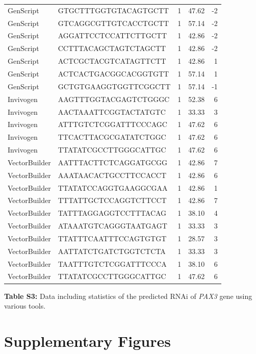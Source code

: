\documentclass[
]{article}
\begin{document}
\begin{longtable}[]{@{}llrrr@{}}
GenScript & GTGCTTTGGTGTACAGTGCTT & 1 & 47.62 & -2 \\
GenScript & GTCAGGCGTTGTCACCTGCTT & 1 & 57.14 & -2 \\
GenScript & AGGATTCCTCCATTCTTGCTT & 1 & 42.86 & -2 \\
GenScript & CCTTTACAGCTAGTCTAGCTT & 1 & 42.86 & -2 \\
GenScript & ACTCGCTACGTCATAGTTCTT & 1 & 42.86 & 1 \\
GenScript & ACTCACTGACGGCACGGTGTT & 1 & 57.14 & 1 \\
GenScript & GCTGTGAAGGTGGTTCGGCTT & 1 & 57.14 & -1 \\
Invivogen & AAGTTTGGTACGAGTCTGGGC & 1 & 52.38 & 6 \\
Invivogen & AACTAAATTCGGTACTATGTC & 1 & 33.33 & 3 \\
Invivogen & ATTTGTCTCGGATTTCCCAGC & 1 & 47.62 & 6 \\
Invivogen & TTCACTTACGCGATATCTGGC & 1 & 47.62 & 6 \\
Invivogen & TTATATCGCCTTGGGCATTGC & 1 & 47.62 & 6 \\
VectorBuilder & AATTTACTTCTCAGGATGCGG & 1 & 42.86 & 7 \\
VectorBuilder & AAATAACACTGCCTTCCACCT & 1 & 42.86 & 6 \\
VectorBuilder & TTATATCCAGGTGAAGGCGAA & 1 & 42.86 & 1 \\
VectorBuilder & TTTATTGCTCCAGGTCTTCCT & 1 & 42.86 & 7 \\
VectorBuilder & TATTTAGGAGGTCCTTTACAG & 1 & 38.10 & 4 \\
VectorBuilder & ATAAATGTCAGGGTAATGAGT & 1 & 33.33 & 3 \\
VectorBuilder & TTATTTCAATTTCCAGTGTGT & 1 & 28.57 & 3 \\
VectorBuilder & AATTATCTGATCTGGTCTCTA & 1 & 33.33 & 3 \\
VectorBuilder & TAATTTGTCTCGGATTTCCCA & 1 & 38.10 & 6 \\
VectorBuilder & TTATATCGCCTTGGGCATTGC & 1 & 47.62 & 6 \\
\end{longtable}

\textbf{Table S3:} Data including statistics of the predicted RNAi of
\emph{PAX3} gene using various tools.

\newpage

\section{Supplementary Figures}\label{supplementary-figures}
\end{document}
